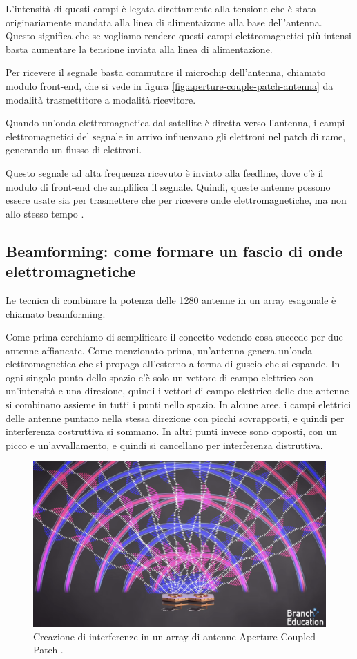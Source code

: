 L'intensità di questi campi è legata direttamente alla tensione che è stata originariamente mandata alla linea di alimentaizone alla base dell'antenna.
Questo significa che se vogliamo rendere questi campi elettromagnetici più intensi basta aumentare la tensione inviata alla linea di alimentazione.

Per ricevere il segnale basta commutare il microchip dell'antenna, chiamato modulo front-end, che si vede in figura \ref{fig:aperture-couple-patch-antenna} da modalità trasmettitore a modalità ricevitore.

Quando un'onda elettromagnetica dal satellite è diretta verso l'antenna, i campi elettromagnetici del segnale in arrivo influenzano gli elettroni nel patch di rame, generando un flusso di elettroni.

Questo segnale ad alta frequenza ricevuto è inviato alla feedline, dove c'è il modulo di front-end che amplifica il segnale.
Quindi, queste antenne possono essere usate sia per trasmettere che per ricevere onde elettromagnetiche, ma non allo stesso tempo \cite{branch_education_how_2022}.

\subsection{Beamforming: come formare un fascio di onde elettromagnetiche}
Le tecnica di combinare la potenza delle 1280 antenne in un array esagonale è chiamato beamforming.

Come prima cerchiamo di semplificare il concetto vedendo cosa succede per due antenne affiancate.
Come menzionato prima, un'antenna genera un'onda elettromagnetica che si propaga all'esterno a forma di guscio che si espande.
In ogni singolo punto dello spazio c'è solo un vettore di campo elettrico con un'intensità e una direzione, quindi i vettori di campo elettrico delle due antenne si combinano assieme in tutti i punti nello spazio.
In alcune aree, i campi elettrici delle antenne puntano nella stessa direzione con picchi sovrapposti, e quindi per interferenza costruttiva si sommano.
In altri punti invece sono opposti, con un picco e un'avvallamento, e quindi si cancellano per interferenza distruttiva.

\begin{figure}[htbp]
  \centering
  \includegraphics[width=0.8\linewidth]{./res/img/antenna_interference.png}
  \caption{Creazione di interferenze in un array di antenne Aperture Coupled Patch \cite{branch_education_how_2022}.}
  \label{fig:aperture-couple-patch-antenna-interference}
\end{figure}


